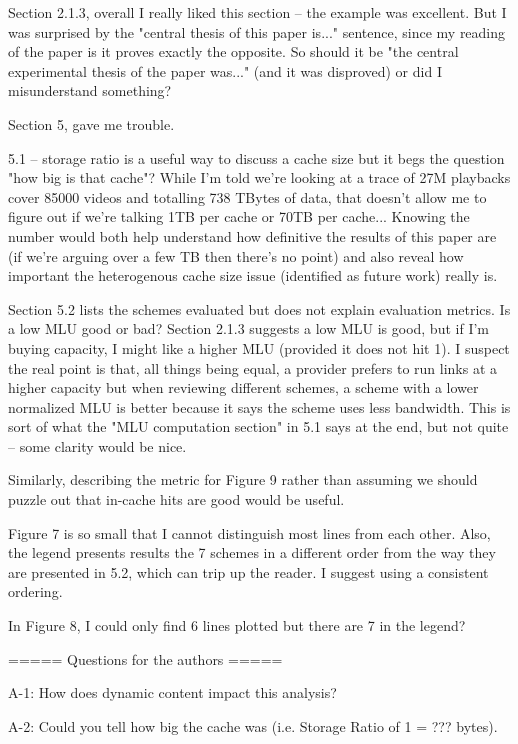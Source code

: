 Section 2.1.3, overall I really liked this section -- the example was excellent.  But I was surprised by the "central thesis of this paper is..." sentence, since my reading of the paper is it proves exactly the opposite.  So should it be "the central experimental thesis of the paper was..." (and it was disproved) or did I misunderstand something?

Section 5, gave me trouble.

5.1 -- storage ratio is a useful way to discuss a cache size but it begs the question "how big is that cache"?   While I'm told we're looking at a trace of 27M playbacks cover 85000 videos and totalling 738 TBytes of data, that doesn't allow me to figure out if we're talking 1TB per cache or 70TB per cache...   Knowing the number would both help understand how definitive the results of this paper are (if we're arguing over a few TB then there's no point) and also reveal how important the heterogenous cache size issue (identified as future work) really is.

Section 5.2 lists the schemes evaluated but does not explain evaluation metrics.  Is a low MLU good or bad?  Section 2.1.3 suggests a low MLU is good, but if I'm buying capacity, I might like a higher MLU (provided it does not hit 1).  I suspect the real point is that, all things being equal, a provider prefers to run links at a higher capacity but when reviewing different schemes, a scheme with a lower normalized MLU is better because it says the scheme uses less bandwidth.   This is sort of what the "MLU computation section" in 5.1 says at the end, but not quite -- some clarity would be nice.

Similarly, describing the metric for Figure 9 rather than assuming we should puzzle out that in-cache hits are good would be useful.

Figure 7 is so small that I cannot distinguish most lines from each other.   Also, the legend presents results the 7 schemes in a different order from the way they are presented in 5.2, which can trip up the reader.  I suggest using a consistent ordering.

In Figure 8, I could only find 6 lines plotted but there are 7 in the legend?

                   ===== Questions for the authors =====

A-1: How does dynamic content impact this analysis?

A-2: Could you tell how big  the cache was (i.e. Storage Ratio of 1 = ??? bytes).


